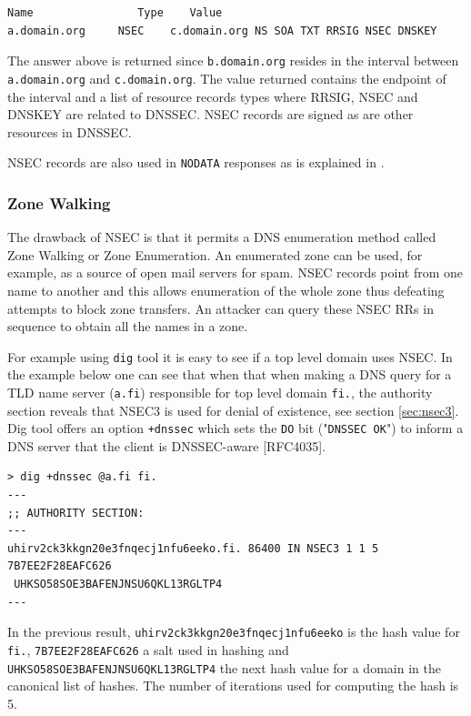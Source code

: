 \begin{verbatim}
Name	            Type    Value
a.domain.org     NSEC    c.domain.org NS SOA TXT RRSIG NSEC DNSKEY
\end{verbatim}

The answer above is returned since \texttt{b.domain.org} resides in the interval between \texttt{a.domain.org} and \texttt{c.domain.org}. The value returned contains the endpoint of the interval and a list of resource records types where RRSIG, NSEC and DNSKEY are related to DNSSEC. NSEC records are signed as are other resources in DNSSEC. 

NSEC records are also used in \texttt{NODATA} responses as is explained in \citep{RFC_7129}.

\subsubsection{Zone Walking}

The drawback of NSEC is that it permits a DNS enumeration method called Zone Walking or Zone Enumeration. An enumerated zone can be used, for example, as a source of open mail servers for spam. NSEC records point from one name to another and this allows enumeration of the whole zone thus defeating attempts to block zone transfers. An attacker can query these NSEC RRs in sequence to obtain all the names in a zone. \citep{hacking_exposed} \citep{RFC_7129} 

For example using \texttt{dig} tool it is easy to see if a top level domain uses NSEC. In the example below one can see that when that when making a DNS query for a TLD name server (\texttt{a.fi}) responsible for top level domain \texttt{fi.}, the authority section reveals that NSEC3 is used for denial of existence, see section \ref{sec:nsec3}. Dig tool offers an option \texttt{+dnssec} which sets the \texttt{DO} bit ("\texttt{DNSSEC OK}") to inform a DNS server that the client is DNSSEC-aware [RFC4035].


\begin{verbatim}
> dig +dnssec @a.fi fi.
---
;; AUTHORITY SECTION:
---
uhirv2ck3kkgn20e3fnqecj1nfu6eeko.fi. 86400 IN NSEC3 1 1 5 7B7EE2F28EAFC626
 UHKSO58SOE3BAFENJNSU6QKL13RGLTP4
---
\end{verbatim}

In the previous result, \texttt{uhirv2ck3kkgn20e3fnqecj1nfu6eeko} is the hash value for \texttt{fi.}, \texttt{7B7EE2F28EAFC626} a salt used in hashing and \texttt{UHKSO58SOE3BAFENJNSU6QKL13RGLTP4} the next hash value for a domain in the canonical list of hashes. The number of iterations used for computing the hash is 5. 

